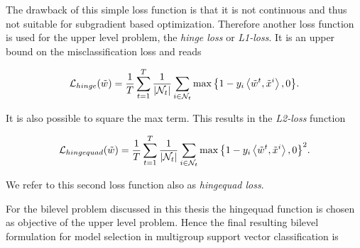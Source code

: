 The drawback of this simple loss function is that it is not continuous and thus not suitable for subgradient based optimization. Therefore another loss function is used for the upper level problem, the \emph{hinge loss} or \emph{L1-loss}. It is an upper bound on the misclassification loss and reads

\begin{equation}
		\mathcal{L}_{hinge}(\tilde{w}) = \frac{1}{T}\sum_{t=1}^T\frac{1}{|\mathcal{N}_t|}\sum_{i \in \mathcal{N}_t}{\max\left\{1-y_i\left\langle \tilde{w}^t,\tilde{x}^i\right\rangle,0\right\}}.
\label{hinge_loss}
\end{equation}

It is also possible to square the max term. This results in the \emph{L2-loss} function

\begin{equation}
		\mathcal{L}_{hingequad}(\tilde{w}) = \frac{1}{T}\sum_{t=1}^T\frac{1}{|\mathcal{N}_t|}\sum_{i \in \mathcal{N}_t}{\max\left\{1-y_i\left\langle \tilde{w}^t,\tilde{x}^i\right\rangle,0\right\}^2}.
\label{hingequad_loss}
\end{equation}

We refer to this second loss function also as \emph{hingequad loss}.



For the bilevel problem discussed in this thesis the hingequad function is chosen as objective of the upper level problem.
Hence the final resulting bilevel formulation for model selection in multigroup support vector classification is 

%

